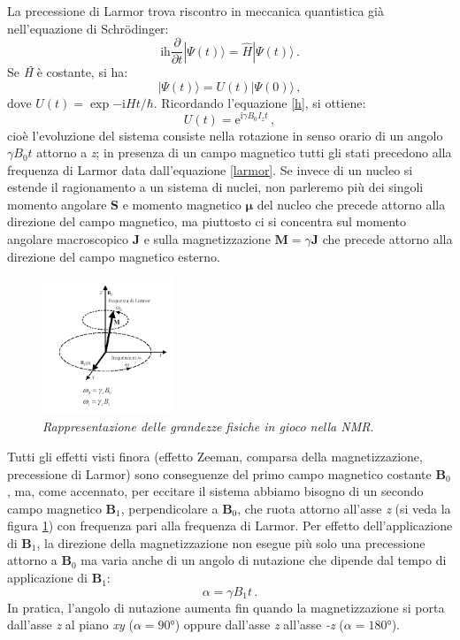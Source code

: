 \documentclass{report}
\newcommand{\figref}[1]{figura \ref{#1}}
\renewcommand{\eqref}[1]{equazione \ref{#1}}
\numberwithin{equation}{section}
\numberwithin{figure}{section}
\renewcommand{\Vec}{\bm}
\begin{document}
La precessione di Larmor trova riscontro in meccanica quantistica già nell'equazione di Schrödinger:
\begin{equation}
    \mathrm{ih}\frac{\partial}{\partial t}|\Psi(t)\rangle=\hat{H}|\Psi(t)\rangle\,.
\end{equation}
Se \textit{\^H} è costante, si ha:
\begin{equation}
    |\Psi(t)\rangle=U(t)|\Psi(0)\rangle\,,
\end{equation}
dove $U(t)=\exp{-\mathrm{i}Ht/\hbar}$. Ricordando l'\eqref{h}, si ottiene:
\begin{equation}
    U(t)=\mathrm{e}^{\mathrm{i}\gamma B_0 I_z t}\,,
\end{equation}
cioè l'evoluzione del sistema consiste nella rotazione in senso orario di un angolo $\gamma B_0 t$ attorno a \textit{z}; in presenza di un campo magnetico tutti gli stati precedono alla frequenza di Larmor data dall'\eqref{larmor}. Se invece di un nucleo si estende il ragionamento a un sistema di nuclei, non parleremo più dei singoli momento angolare $\Vec{S}$ e momento magnetico $\Vec{\mu}$ del nucleo che precede attorno alla direzione del campo magnetico, ma piuttosto ci si concentra sul momento angolare macroscopico $\Vec{J}$ e sulla magnetizzazione $\Vec{M}=\gamma \Vec{J}$ che precede attorno alla direzione del campo magnetico esterno.

\begin{figure}
    \centering
    \includegraphics[width=0.35\textwidth]{immagini/b1.png}
    \caption{\textit{Rappresentazione delle grandezze fisiche in gioco nella NMR}.}
    \label{fig:b1}
\end{figure}

Tutti gli effetti visti finora (effetto Zeeman, comparsa della magnetizzazione, precessione di Larmor) sono conseguenze del primo campo magnetico costante $\Vec{B}_0$, ma, come accennato, per eccitare il sistema abbiamo bisogno di un secondo campo magnetico $\Vec{B}_1$, perpendicolare a $\Vec{B}_0$, che ruota attorno all'asse \textit{z} (si veda la \figref{fig:b1}) con frequenza pari alla frequenza di Larmor. Per effetto dell'applicazione di $\Vec{B}_1$, la direzione della magnetizzazione non esegue più solo una precessione attorno a $\Vec{B}_0$ ma varia anche di un angolo di nutazione che dipende dal tempo di applicazione di $\Vec{B}_1$:
\begin{equation}
    \alpha = \gamma B_1 t\,.
\end{equation}
In pratica, l'angolo di nutazione aumenta fin quando la magnetizzazione si porta dall'asse \textit{z} al piano \textit{xy} ($\alpha = 90$°) oppure dall'asse \textit{z} all'asse \textit{-z} ($\alpha = 180$°).
\end{document}

